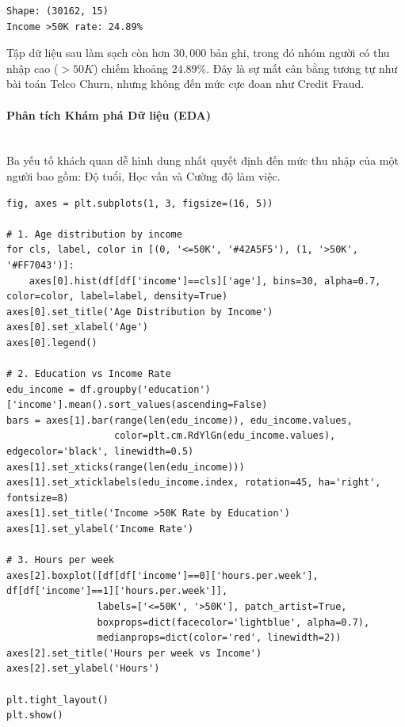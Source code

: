 \begin{lstlisting}[style=consoleoutput, caption={Dữ liệu Census Income đã được làm sạch}]
Shape: (30162, 15)
Income >50K rate: 24.89%
\end{lstlisting}

Tập dữ liệu sau làm sạch còn hơn $30,000$ bản ghi, trong đó nhóm người có thu nhập cao ($>50K$) chiếm khoảng $24.89\%$. Đây là sự mất cân bằng tương tự như bài toán Telco Churn, nhưng không đến mức cực đoan như Credit Fraud.

\paragraph{Phân tích Khám phá Dữ liệu (EDA)} \hfill \\

Ba yếu tố khách quan dễ hình dung nhất quyết định đến mức thu nhập của một người bao gồm: Độ tuổi, Học vấn và Cường độ làm việc.

\begin{lstlisting}[style=pythoncode, caption={Exploratory Data Analysis: Age, Education, and Hours per week}]
fig, axes = plt.subplots(1, 3, figsize=(16, 5))

# 1. Age distribution by income
for cls, label, color in [(0, '<=50K', '#42A5F5'), (1, '>50K', '#FF7043')]:
    axes[0].hist(df[df['income']==cls]['age'], bins=30, alpha=0.7, color=color, label=label, density=True)
axes[0].set_title('Age Distribution by Income')
axes[0].set_xlabel('Age')
axes[0].legend()

# 2. Education vs Income Rate
edu_income = df.groupby('education')['income'].mean().sort_values(ascending=False)
bars = axes[1].bar(range(len(edu_income)), edu_income.values,
                   color=plt.cm.RdYlGn(edu_income.values), edgecolor='black', linewidth=0.5)
axes[1].set_xticks(range(len(edu_income)))
axes[1].set_xticklabels(edu_income.index, rotation=45, ha='right', fontsize=8)
axes[1].set_title('Income >50K Rate by Education')
axes[1].set_ylabel('Income Rate')

# 3. Hours per week
axes[2].boxplot([df[df['income']==0]['hours.per.week'], df[df['income']==1]['hours.per.week']],
                labels=['<=50K', '>50K'], patch_artist=True,
                boxprops=dict(facecolor='lightblue', alpha=0.7),
                medianprops=dict(color='red', linewidth=2))
axes[2].set_title('Hours per week vs Income')
axes[2].set_ylabel('Hours')

plt.tight_layout()
plt.show()
\end{lstlisting}

